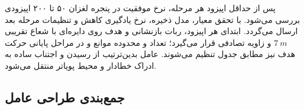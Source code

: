\begin{table}[htbp]
	\centering
	\caption{مراحل یادگیری مرحله‌ای در آموزش عامل}
	\label{tab:curriculum_stages_final}
\end{table}

پس از حداقل اپیزود هر مرحله، نرخ موفقیت در پنجره لغزان ۵۰ تا ۲۰۰ اپیزودی بررسی می‌شود. با تحقق معیار، مدل ذخیره، نرخ یادگیری کاهش و تنظیمات مرحله بعد ارسال می‌گردد. ابتدای هر اپیزود، ربات بازنشانی و هدف روی دایره‌ای با شعاع تقریبی \(7~m\) و زاویه تصادفی قرار می‌گیرد؛ تعداد و محدوده موانع و در مراحل پایانی حرکت هدف نیز مطابق جدول تنظیم می‌شوند. عامل بدین‌ترتیب از رسیدن و اجتناب ساده به ادراک خطادار و محیط پویاتر منتقل می‌شود.

\subsection{جمع‌بندی طراحی عامل}
\label{subsec:agent_design_summary_final}


